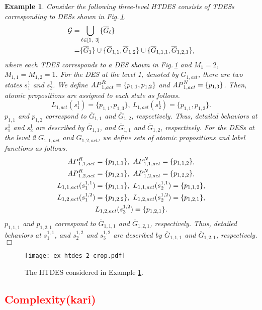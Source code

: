 \documentclass{article}
\newcommand{\qedwhite}{\hfill \ensuremath{\Box}}
\newtheorem{exa}{Example}
\newcommand{\rfig}[1]{Fig.\,\ref{#1}}
\newcommand{\AP}{{\textit AP}}
\newcommand{\red}[1]{\textcolor{red}{#1}}
\begin{document}
\begin{exa}\label{exa:hier}
Consider the following three-level HTDES consists of TDESs corresponding to DESs shown in \rfig{ex:htdes}.
\begin{align}
\mathcal{G}
=&\bigcup_{\ell\in[1,~3]}\{\overline{G}_\ell\}\notag \\
=&\{\overline{G}_1\}\cup\{\overline{G}_{1,1},\overline{G}_{1,2}\}\cup\{\overline{G}_{1,1,1},\overline{G}_{1,2,1}\},
\end{align}
where each TDES corresponds to a DES shown in \rfig{ex:htdes} and $M_1=2$, $M_{1,1}=M_{1,2}=1$.
For the DES at the level 1, denoted by  $G_{1,act}$, there are two states $s_{1}^1$ and $s_{2}^1$.
We define $\AP^R_{1,act}=\{p_{1,1},p_{1,2}\}$ and $\AP^N_{1,act}=\{p_{1,3}\}$. Then, atomic propositions are assigned to each state as follows.
\[
L_{1,act}(s_{1}^1) = \{p_{1,1},p_{1,3}\},~
L_{1,act}(s_{2}^1) = \{p_{1,1},p_{1,2}\}.
\]
$p_{1,1}$ and $p_{1,2}$ correspond to $\overline{G}_{1,1}$ and $\overline{G}_{1,2}$, respectively. 
Thus, detailed behaviors at $s_{1}^1$ and $s_{2}^1$ are described by $\overline{G}_{1,1}$, and $\overline{G}_{1,1}$ and $\overline{G}_{1,2}$, respectively.
For the DESs at the level 2  $G_{1,1,act}$ and $G_{1,2,act}$, we define sets of atomic propositions and label functions as follows. 
\begin{gather}
\AP^R_{1,1,act}=\{p_{1,1,1}\},~\AP^N_{1,1,act}=\{p_{1,1,2}\},
\notag\\
\AP^R_{1,2,act}=\{p_{1,2,1}\},~\AP^N_{1,2,act}=\{p_{1,2,2}\},
\notag\\
L_{1,1,act}(s_{1}^{1,1}) = \{p_{1,1,1}\},~
L_{1,1,act}(s_{2}^{1,1}) = \{p_{1,1,2}\},
\notag\\
L_{1,2,act}(s_{1}^{1,2}) = \{p_{1,2,2}\},~
L_{1,2,act}(s_{2}^{1,2}) = \{p_{1,2,1}\},
\notag\\
L_{1,2,act}(s_{3}^{1,2}) = \{p_{1,2,1}\}.\notag
\end{gather}
%
$p_{1,1,1}$ and $p_{1,2,1}$ correspond to $\overline{G}_{1,1,1}$ and $\overline{G}_{1,2,1}$, respectively. 
Thus, detailed behaviors at $s_{1}^{1,1}$, and $s_{2}^{1,2}$ and $s_{3}^{1,2}$ are described by $\overline{G}_{1,1,1}$ and $\overline{G}_{1,2,1}$, respectively.
\qedwhite
\end{exa}
%
\begin{figure}
\centering
\texttt{[image: ex\_htdes\_2-crop.pdf]}
\caption{The HTDES considered in Example \ref{exa:hier}.}
\label{ex:htdes}
\end{figure}
%
%
%
\red{\subsection{Complexity(kari)}}
%
%
%
\end{document}
